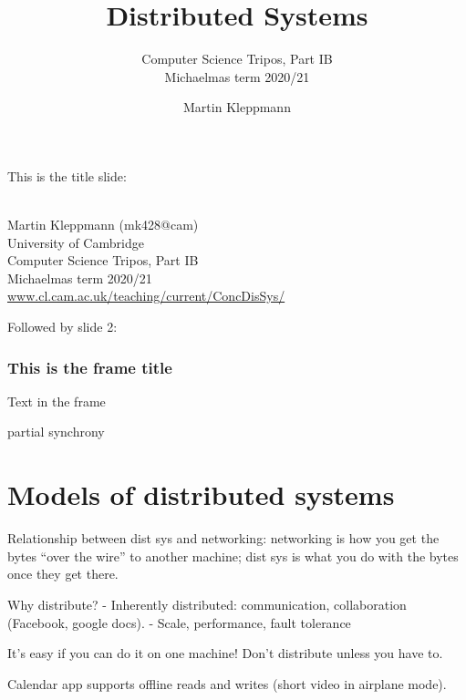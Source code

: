 
\title{Distributed Systems}
\subtitle{Computer Science Tripos, Part IB\\Michaelmas term 2020/21}
\author{Martin Kleppmann}
\date{}
\maketitle

This is the title slide:

\begin{frame}
    \label{s:title}
    \begin{center}
        \textbf{\huge{\color{darkblue}{Distributed Systems}}} \\[2em]
        Martin Kleppmann (mk428@cam) \\[2em]
        University of Cambridge \\[0.5em]
        Computer Science Tripos, Part IB \\[0.5em]
        Michaelmas term 2020/21 \\[0.5em]
        \href{https://www.cl.cam.ac.uk/teaching/current/ConcDisSys/}{www.cl.cam.ac.uk/teaching/current/ConcDisSys/}
    \end{center}
\end{frame}

Followed by slide 2:

\begin{frame}
    \label{s:test}
    \frametitle{This is the frame title}
    Text in the frame

    partial synchrony
\end{frame}

\section{Models of distributed systems}

Relationship between dist sys and networking: networking is how you get the bytes ``over the wire'' to another machine; dist sys is what you do with the bytes once they get there.

Why distribute?
- Inherently distributed: communication, collaboration (Facebook, google docs).
- Scale, performance, fault tolerance

It's easy if you can do it on one machine! Don't distribute unless you have to. 

Calendar app supports offline reads and writes (short video in airplane mode).

